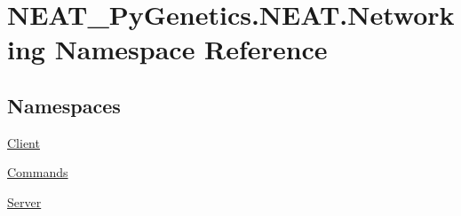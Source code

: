 \hypertarget{namespaceNEAT__PyGenetics_1_1NEAT_1_1Networking}{}\section{N\+E\+A\+T\+\_\+\+Py\+Genetics.\+N\+E\+A\+T.\+Networking Namespace Reference}
\label{namespaceNEAT__PyGenetics_1_1NEAT_1_1Networking}
\subsection*{Namespaces}
\begin{DoxyCompactItemize}
\item 
 \hyperlink{namespaceNEAT__PyGenetics_1_1NEAT_1_1Networking_1_1Client}{Client}
\item 
 \hyperlink{namespaceNEAT__PyGenetics_1_1NEAT_1_1Networking_1_1Commands}{Commands}
\item 
 \hyperlink{namespaceNEAT__PyGenetics_1_1NEAT_1_1Networking_1_1Server}{Server}
\end{DoxyCompactItemize}

